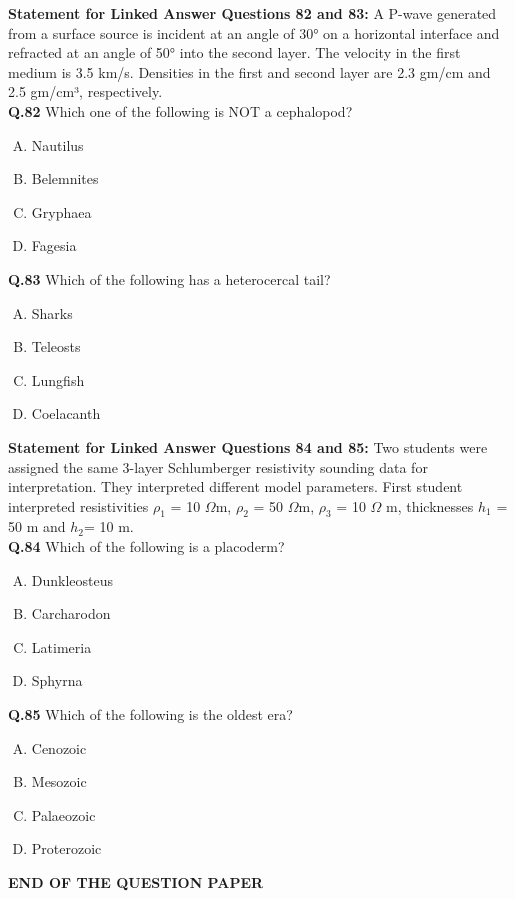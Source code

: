 \noindent\textbf{Statement for Linked Answer Questions 82 and 83:} A P-wave generated from a surface source is incident at an angle of 30° on a horizontal interface and refracted at an angle of 50° into the second layer. The velocity in the first medium is 3.5 km/s. Densities in the first and second layer are 2.3 gm/cm and 2.5 gm/cm³, respectively.\\

 
\textbf{Q.82} Which one of the following is NOT a cephalopod?
\begin{multicols}{4}
    

\begin{enumerate}[(A)]
    \item Nautilus
    \item Belemnites
    \item Gryphaea
    \item Fagesia
\end{enumerate}
\end{multicols}
\textbf{Q.83} Which of the following has a heterocercal tail?
\begin{enumerate}[(A)]
    \item Sharks
    \item Teleosts
    \item Lungfish
    \item Coelacanth
\end{enumerate}
\noindent\textbf{Statement for Linked Answer Questions 84 and 85:} Two students were assigned the same 3-layer Schlumberger resistivity sounding data for interpretation. They interpreted different model parameters.
First student interpreted resistivities $\rho_1$ = 10 $\Omega$m, $\rho_2$ = 50 $\Omega$m, $\rho_3$ = 10 $\Omega$ m, thicknesses $h_1$ = 50 m and $h_2$= 10 m.\\

\textbf{Q.84} Which of the following is a placoderm?
\begin{multicols}{4}
    

\begin{enumerate}[(A)]
    \item Dunkleosteus
    \item Carcharodon
    \item Latimeria
    \item Sphyrna
\end{enumerate}
\end{multicols}
\textbf{Q.85} Which of the following is the oldest era?
\begin{multicols}{4}
    

\begin{enumerate}[(A)]
    \item Cenozoic
    \item Mesozoic
    \item Palaeozoic
    \item Proterozoic
\end{enumerate}
\end{multicols}


\begin{center}
{\Large \textbf{END OF THE QUESTION PAPER}}
\end{center}


